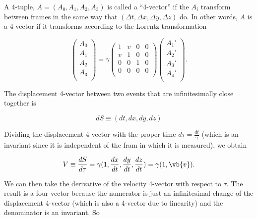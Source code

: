 \documentclass[english,a4paper,12pt]{report}
\begin{document}
\begin{definition}
A 4-tuple, \(A = (A_0 , A_1 , A_2 , A_3 )\) is called a ``4-vector'' if the \(A_{i} \) transform between frames in the same way that \((\Delta t, \Delta x, \Delta y, \Delta z)\) do. In other words, \(A\) is a 4-vector if it transforms according to the Lorentz transformation

\begin{equation}
    \begin{pmatrix}
         A_0  \\
         A_1  \\
         A_2  \\
         A_3  \\
    \end{pmatrix} = \gamma \begin{pmatrix}
        1  & v & 0 & 0  \\
        v & 1 & 0 & 0  \\
        0 & 0 & 1 & 0  \\
        0 & 0 & 0 & 0  \\
    \end{pmatrix} \begin{pmatrix}
         A_1 ' \\
         A_2 ' \\
         A_3 ' \\
         A_4 ' \\
    \end{pmatrix}.
\end{equation}
\end{definition}

The displacement 4-vector between two events that are infinitesimally close together is 

\begin{equation}
    dS \equiv (dt,dx,dy,dz)
\end{equation}

Dividing the displacement 4-vector with the proper time \(d \tau = \frac{dt}{\gamma } \) (which is an invariant since it is independent of the fram in which it is measured), we obtain 

\begin{equation}
    V \equiv  \frac{dS}{d\tau } = \gamma (1, \frac{dx}{dt}, \frac{dy}{dt}, \frac{dz}{dt}) = \gamma (1, \vb{v} ).
\end{equation}

We can then take the derivative of the velocity 4-vector with respect to \(\tau \). The result is a four vector because the numerator is just an infinitesimal change of the displacement 4-vector (which is also a 4-vector due to linearity) and the denominator is an invariant. So
\end{document}
